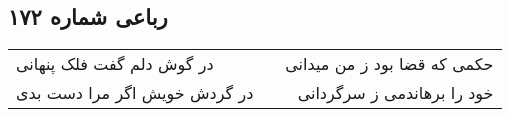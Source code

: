 \begin{center}
\section*{رباعی شماره ۱۷۲}
\label{sec:sh172}
\begin{longtable}{l p{0.5cm} r}
در گوش دلم گفت فلک پنهانی
&&
حکمی که قضا بود ز من میدانی
\\
در گردش خویش اگر مرا دست بدی
&&
خود را برهاندمی ز سرگردانی
\\
\end{longtable}
\end{center}
